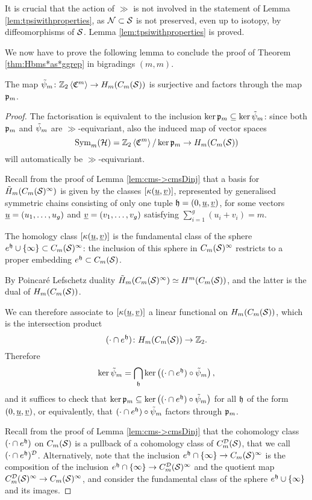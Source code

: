 It is crucial that the action of $\gg$ is not involved in the statement of Lemma
\ref{lem:tpsiwithproperties}, as $\N\subset\S$ is not preserved, even up to isotopy,
by diffeomorphisms of $\S$.
Lemma \ref{lem:tpsiwithproperties} is proved.

We now have to prove the following lemma to conclude the proof of Theorem \ref{thm:Hbms*as*ggrep}
in bigradings $(m,m)$.
\begin{lem}
 \label{lem:tpsi->psi}
The map $\tpsi_m\colon\ZcC{m}\to H_m(\cms)$ is surjective and factors through the map $\pr_m$.
\end{lem}
\begin{proof}
The factorisation is equivalent to the inclusion $\ker\pr_m\subseteq\ker\tpsi_m$: since both
$\pr_m$ and $\tpsi_m$
are $\gg$-equivariant, also the induced map of vector spaces
\[
\Sym_m(\H)=\ZcC{m}/\ker\pr_m\to H_m(\cms)
\]
will automatically be
$\gg$-equivariant.

Recall from the proof of Lemma \ref{lem:cms->cmsDinj} that a basis for $\tH_m(\cms^{\infty})$ 
is given by the classes $[\kappa(\uu,\uv)]$, represented by generalised
symmetric chains consisting of only one tuple $\tup=(0,\uu,\uv)$, for some vectors
$\uu=(u_1,\dots,u_g)$ and $\uv=(v_1,\dots,v_g)$ satisfying $\sum_{i=1}^g(u_i+v_i)=m$.

The homology class
$[\kappa(\uu,\uv)]$ is the fundamental class
of the sphere $e^{\tup}\cup\set{\infty}\subset\cms^{\infty}$: the inclusion of this sphere in $\cms^{\infty}$
restricts to a proper embedding $e^{\tup}\subset\cms$.

By Poincaré Lefschetz duality $\tH_m(\cms^{\infty})\simeq H^m(\cms)$, and the latter is
the dual of $H_m(\cms)$.

We can therefore associate to $[\kappa(\uu,\uv)]$ a linear functional
on $H_m(\cms)$, which is the intersection product
\[
 (\cdot\cap e^{\tup})\colon H_m(\cms)\to\Z_2.
\]
Therefore
\[
 \ker\tpsi_m=\bigcap_{\tup}\ker\pa{(\cdot\cap e^{\tup})\circ\tpsi_m},
\]
and it suffices to check that $\ker\pr_m\subseteq\ker\pa{(\cdot\cap e^{\tup})\circ\tpsi_m}$
for all $\tup$ of the form $(0,\uu,\uv)$, or equivalently, that $(\cdot\cap e^{\tup})\circ\tpsi_m$ factors through $\pr_m$.

Recall from the proof of Lemma \ref{lem:cms->cmsDinj} that the cohomology class $(\cdot\cap e^{\tup})$ on $\cms$ is a pullback
of a cohomology class of $\cmsD$, that we call $(\cdot\cap e^{\tup})^{\D}$. Alternatively,
note that the inclusion $e^{\tup}\cap \set{\infty}\to\cms^{\infty}$ is the composition of the inclusion $e^{\tup}\cap\set{\infty}\to\cmsD^{\infty}$
and the quotient map $\cmsD^{\infty}\to\cms^{\infty}$, and consider the fundamental class of the sphere $e^{\tup}\cup\set{\infty}$ and its images.


\end{proof}
